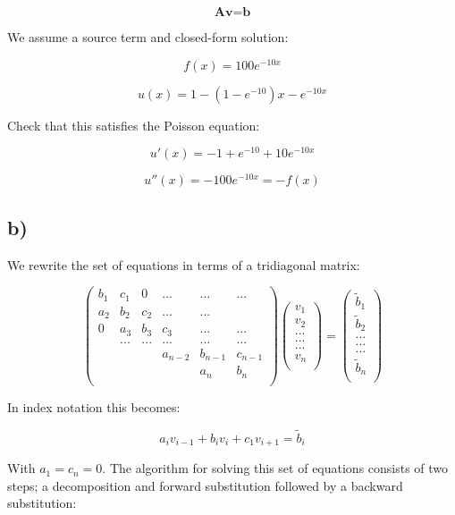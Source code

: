 \documentclass[11pt]{article}
\begin{document}
\begin{flushleft}
$$
\textbf{A} \textbf{v} = \textbf{b}
$$


\end{flushleft}

\begin{flushleft}
We assume a source term and closed-form solution:

\begin{equation}
f(x) = 100e^{-10x}
\end{equation}

\begin{equation}
u(x) = 1 - (1-e^{-10})x - e^{-10x}
\end{equation}

Check that this satisfies the Poisson equation:

$$
u'(x) = - 1 + e^{-10} + 10 e^{-10x}
$$

$$
u''(x) = -100 e^{-10x} = - f(x)
$$


\end{flushleft}


\subsection*{b)}

\begin{flushleft}
We rewrite the set of equations in terms of a tridiagonal matrix:

$$
\begin{pmatrix}
b_1 & c_1 & 0 & ... & ... & ...\\
a_2 & b_2 & c_2 & ... & ...\\
0 & a_3 & b_3 & c_3 & ... & ...\\
& ... & ... & ... & ...& ...\\
& & & a_{n-2} & b_{n-1} & c_{n-1}\\
& & & & a_n & b_n\\ 
\end{pmatrix}
\begin{pmatrix}
v_1\\
v_2\\
...\\
...\\
...\\
v_n\\
\end{pmatrix}
=
\begin{pmatrix}
\tilde{b}_1\\
\tilde{b}_2\\
...\\
...\\
...\\
\tilde{b}_n\\
\end{pmatrix}
$$

In index notation this becomes:

\begin{equation}
a_i v_{i-1} + b_i v_i + c_1 v_{i+1} = \tilde{b}_i
\end{equation}

With $a_1= c_n = 0$. The algorithm for solving this set of equations consists of two steps; a decomposition and forward substitution followed by a backward substitution:
\end{flushleft}
\end{document}
